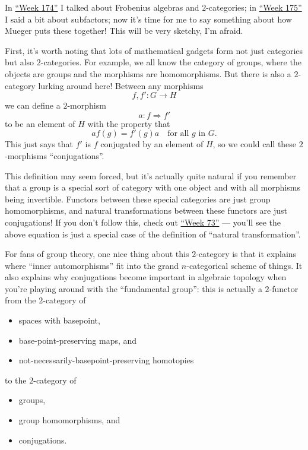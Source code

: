 \documentclass{article}
\def\tightlist{}
\begin{document}
In \protect\hyperlink{week174}{``Week 174''} I talked about Frobenius
algebras and \(2\)-categories; in \protect\hyperlink{week175}{``Week
175''} I said a bit about subfactors; now it's time for me to say
something about how Mueger puts these together! This will be very
sketchy, I'm afraid.

First, it's worth noting that lots of mathematical gadgets form not just
categories but also \(2\)-categories. For example, we all know the
category of groups, where the objects are groups and the morphisms are
homomorphisms. But there is also a \(2\)-category lurking around here!
Between any morphisms \[f,f'\colon  G \to  H\] we can define a
\(2\)-morphism \[a\colon f \Rightarrow f'\] to be an element of \(H\)
with the property that
\[af(g) = f'(g)a    \quad\mbox{for all $g$ in $G$.}\] This just says
that \(f'\) is \(f\) conjugated by an element of \(H\), so we could call
these \(2\)-morphisms ``conjugations''.

This definition may seem forced, but it's actually quite natural if you
remember that a group is a special sort of category with one object and
with all morphisms being invertible. Functors between these special
categories are just group homomorphisms, and natural transformations
between these functors are just conjugations! If you don't follow this,
check out \protect\hyperlink{week73}{``Week 73''} --- you'll see the
above equation is just a special case of the definition of ``natural
transformation''.

For fans of group theory, one nice thing about this \(2\)-category is
that it explains where ``inner automorphisms'' fit into the grand
\(n\)-categorical scheme of things. It also explains why conjugations
become important in algebraic topology when you're playing around with
the ``fundamental group'': this is actually a \(2\)-functor from the
\(2\)-category of

\begin{itemize}
\tightlist
\item
  spaces with basepoint,
\item
  base-point-preserving maps, and
\item
  not-necessarily-basepoint-preserving homotopies
\end{itemize}

to the \(2\)-category of

\begin{itemize}
\tightlist
\item
  groups,
\item
  group homomorphisms, and
\item
  conjugations.
\end{itemize}
\end{document}

